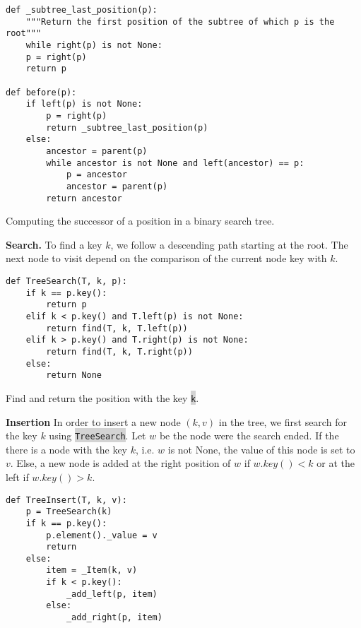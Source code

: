 \documentclass[10pt]{article}
\newcommand{\code}[1]{{\small\colorbox{LightGray}{\texttt{#1}}}}
\begin{document}
\begin{listing}[ht]
\begin{verbatim}
def _subtree_last_position(p):
	"""Return the first position of the subtree of which p is the root"""
	while right(p) is not None:
	p = right(p)
	return p
	
def before(p):
	if left(p) is not None:
	    p = right(p)
	    return _subtree_last_position(p)
	else:
	    ancestor = parent(p)
	    while ancestor is not None and left(ancestor) == p:
	        p = ancestor
	        ancestor = parent(p)
	    return ancestor
\end{verbatim}
	\caption{Computing the successor of a position in a binary search tree.}
	\label{listing:before}
\end{listing}
\textbf{Search.} To find a key $k$, we follow a descending path starting at the root. The next node to visit depend on the comparison of the current node key with $k$.
\begin{listing}[ht]
\begin{verbatim}
def TreeSearch(T, k, p):
    if k == p.key():
        return p
    elif k < p.key() and T.left(p) is not None:
        return find(T, k, T.left(p))
    elif k > p.key() and T.right(p) is not None:
        return find(T, k, T.right(p))
    else:
        return None
\end{verbatim}
\caption{Find and return the position with the key \code{k}.}
\label{listing:before}
\end{listing}

\textbf{Insertion}
In order to insert a new node $(k, v)$ in the tree, we first search for the key $k$ using \code{TreeSearch}. Let $w$ be the node were the search ended. If the there is a node with the key $k$, i.e. $w$ is not None, the value of this node is set to $v$. Else, a new node is added at the right position of $w$ if $w.key()<k$ or at the left if $w.key()>k$. 
\begin{verbatim}
def TreeInsert(T, k, v):
    p = TreeSearch(k)
    if k == p.key():
        p.element()._value = v
        return
    else:
        item = _Item(k, v)
        if k < p.key():
            _add_left(p, item)
        else:
            _add_right(p, item)
\end{verbatim}
\end{document}

